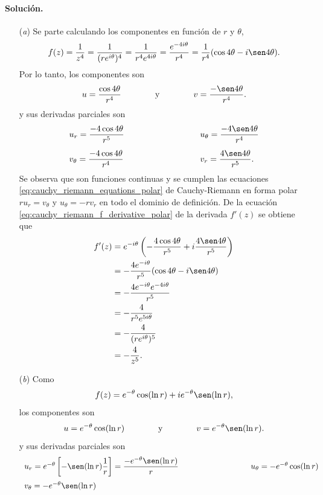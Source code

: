 \documentclass[a4paper]{report}
\begin{document}
\paragraph{Solución.} 
\begin{enumerate}
 \item[(\textit{a})] Se parte calculando los componentes en función de \(r\) y \(\theta\),
  \[
   f(z)=\frac{1}{z^4}=\frac{1}{(re^{i\theta})^4}=\frac{1}{r^4e^{4i\theta}}
    =\frac{e^{-4i\theta}}{r^4}=\frac{1}{r^4}(\cos4\theta-i\sen4\theta).
  \]
  Por lo tanto, los componentes son
  \[
  u=\frac{\cos4\theta}{r^4}
  \qquad\qquad\textrm{y}\qquad\qquad
  v=\frac{-\sen4\theta}{r^4}.
 \]
 y sus derivadas parciales son 
 \[
 \begin{array}{ll}
  u_r=\dfrac{-4\cos4\theta}{r^5}
  \qquad\qquad\qquad\qquad&
  u_\theta=\dfrac{-4\sen4\theta}{r^4}\\[\bigskipamount]
  v_\theta=\dfrac{-4\cos4\theta}{r^4}
  \qquad\qquad\qquad\qquad&
  v_r=\dfrac{4\sen4\theta}{r^5}.
 \end{array}
 \]
 Se observa que son funciones continuas y se cumplen las ecuaciones \ref{eq:cauchy_riemann_equations_polar} de Cauchy-Riemann en forma polar \(ru_r=v_\theta\) y \(u_\theta=-rv_r\) en todo el dominio de definición. De la ecuación \ref{eq:cauchy_riemann_f_derivative_polar} de la derivada \(f'(z)\) se obtiene que 
 \begin{align*}
  f'(z)&=e^{-i\theta}\left(-\frac{4\cos4\theta}{r^5}+i\frac{4\sen4\theta}{r^5}\right)\\
   &=-\frac{4e^{-i\theta}}{r^5}(\cos4\theta-i\sen4\theta)\\
   &=-\frac{4e^{-i\theta}e^{-4i\theta}}{r^5}\\
   &=-\frac{4}{r^5e^{5i\theta}}\\
   &=-\frac{4}{(re^{i\theta})^5}\\
   &=-\frac{4}{z^5}.
 \end{align*}
 \item[(\textit{b})] Como
 \[
  f(z)=e^{-\theta}\cos(\ln r)+ie^{-\theta}\sen(\ln r),
 \]
 los componentes son
 \[
  u=e^{-\theta}\cos(\ln r)
  \qquad\qquad\textrm{y}\qquad\qquad
  v=e^{-\theta}\sen(\ln r).
 \]
 y sus derivadas parciales son 
 \[
 \begin{array}{ll}
  u_r=e^{-\theta}\left[-\sen(\ln r)\dfrac{1}{r}\right]=\dfrac{-e^{-\theta}\sen(\ln r)}{r}
  \qquad\qquad\qquad\qquad&
  u_\theta=-e^{-\theta}\cos(\ln r)\\[\bigskipamount]
  v_\theta=-e^{-\theta}\sen(\ln r)
  \qquad\qquad\qquad\qquad&

\end{array}\]
\end{enumerate}
\end{document}
